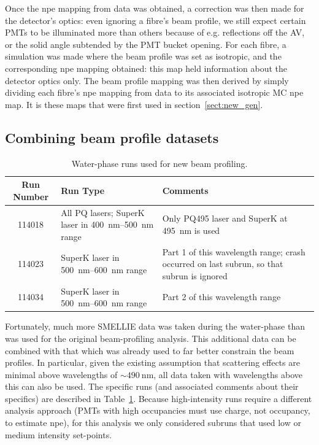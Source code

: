 Once the npe mapping from data was obtained, a correction was then made for the detector's optics: even ignoring a fibre's beam profile, we still expect certain PMTs to be illuminated more than others because of e.g. reflections off the AV, or the solid angle subtended by the PMT bucket opening. For each fibre, a simulation was made where the beam profile was set as isotropic, and the corresponding npe mapping obtained: this map held information about the detector optics only. The beam profile mapping was then derived by simply dividing each fibre's npe mapping from data to its associated isotropic MC npe map. It is these maps that were first used in section~\ref{sect:new_gen}.

\subsection{Combining beam profile datasets}\label{sec:combining_beam_profiles}
    \begin{table}
        \begin{tabular}{c p{6cm} p{6cm}}
            \hline
            Run Number & Run Type & Comments \\ \hline \hline
            \num{114018} & All PQ lasers; SuperK laser in \SIrange{400}{500}{\nano\metre} range & Only PQ495 laser and SuperK at \SI{495}{\nano\metre} is used \\
            \num{114023} & SuperK laser in \SIrange{500}{600}{\nano\metre} range & Part 1 of this wavelength range; crash occurred on last subrun, so that subrun is ignored \\
            \num{114034} & SuperK laser in \SIrange{500}{600}{\nano\metre} range & Part 2 of this wavelength range \\
            \hline
        \end{tabular}
        \caption{Water-phase runs used for new beam profiling.}
        \label{tab:runs_used}
    \end{table}
Fortunately, much more SMELLIE data was taken during the water-phase than was used for the original beam-profiling analysis. This additional data can be combined with that which was already used to far better constrain the beam profiles. In particular, given the existing assumption that scattering effects are minimal above wavelengths of $\sim\SI{490}{\nano\metre}$, all data taken with wavelengths above this can also be used. The specific runs (and associated comments about their specifics) are described in Table~\ref{tab:runs_used}. Because high-intensity runs require a different analysis approach (PMTs with high occupancies must use charge, not occupancy, to  estimate npe), for this analysis we only considered subruns that used low or medium intensity set-points.

